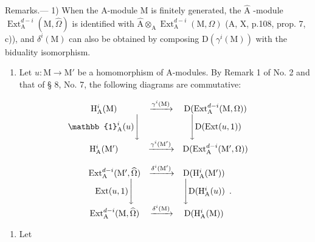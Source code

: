 Remarks.--- 1) When the A-module M is finitely generated, the \(\widehat{\mathrm{A}}\) -module \(\operatorname{Ext}_{\mathrm{A}}^{d-i}(\mathrm{M}, \widehat{\Omega})\) is identified with \(\widehat{\mathrm{A}} \otimes_{\mathrm{A}} \operatorname{Ext}_{\mathrm{A}}^{d-i}(\mathrm{M}, \Omega)\) (A, X, p.108, prop. 7, c)), and \(\delta^{i}(\mathrm{M})\) can also be obtained by composing \(\mathrm{D}(\gamma^{i}(\mathrm{M}))\) with the biduality isomorphism.

\begin{enumerate}
\def\labelenumi{\arabic{enumi})}
\setcounter{enumi}{1}
\tightlist
\item
  Let \(u: \mathrm{M} \to \mathrm{M}'\) be a homomorphism of A-modules. By Remark 1 of No. 2 and that of § 8, No. 7, the following diagrams are commutative:
\end{enumerate}

\[
\begin{array}{c c c} \mathrm{H} _ {\mathrm{A}} ^ {i} (\mathrm{M}) & \xrightarrow {\gamma^ {i} (\mathrm{M})} & \mathrm{D} (\mathrm{Ext} _ {\mathrm{A}} ^ {d - i} (\mathrm{M}, \Omega)) \\ \mathbb {1} _ {\mathrm{A}} ^ {i} (u) \Bigg \downarrow & & \Bigg \downarrow \mathrm{D} (\mathrm{Ext} (u, 1)) \\ \mathrm{H} _ {\mathrm{A}} ^ {i} (\mathrm{M} ^ {\prime}) & \xrightarrow {\gamma^ {i} (\mathrm{M} ^ {\prime})} & \mathrm{D} (\mathrm{Ext} _ {\mathrm{A}} ^ {d - i} (\mathrm{M} ^ {\prime}, \Omega)) \end{array}
\]

\[
\begin{array}{c c c} \operatorname{Ext} _ {\mathrm{A}} ^ {d - i} (\mathrm{M} ^ {\prime}, \widehat {\Omega}) & \xrightarrow {\delta^ {i} (\mathrm{M} ^ {\prime})} & \mathrm{D} (\mathrm{H} _ {\mathrm{A}} ^ {i} (\mathrm{M} ^ {\prime})) \\ \operatorname{Ext} (u, 1) \Bigg \downarrow & & \Bigg \downarrow \mathrm{D} (\mathrm{H} _ {\mathrm{A}} ^ {i} (u)) \\ \operatorname{Ext} _ {\mathrm{A}} ^ {d - i} (\mathrm{M}, \widehat {\Omega}) & \xrightarrow {\delta^ {i} (\mathrm{M})} & \mathrm{D} (\mathrm{H} _ {\mathrm{A}} ^ {i} (\mathrm{M})) \end{array} .
\]

\begin{enumerate}
\def\labelenumi{\arabic{enumi})}
\setcounter{enumi}{2}
\tightlist
\item
  Let
\end{enumerate}

